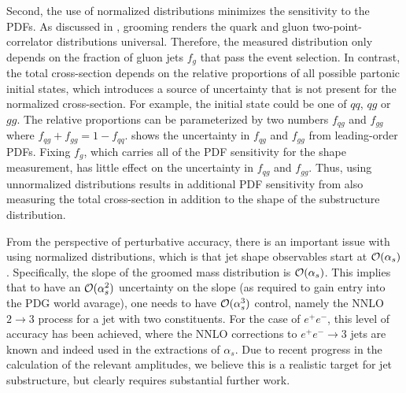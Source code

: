 Second, the use of normalized distributions minimizes the sensitivity to the PDFs.
%
As discussed in , grooming renders the quark and gluon two-point-correlator distributions universal.
%
Therefore, the measured distribution only depends on the fraction of gluon jets $f_g$ that pass the event selection.
%
In contrast, the total cross-section depends on the relative proportions of all possible partonic initial states, which introduces a source of uncertainty that is not present for the normalized cross-section.
%
For example, the initial state could be one of $qq$, $qg$ or $gg$.
%
The relative proportions can be parameterized by two numbers $f_{qg}$ and $f_{gg}$ where $f_{qg}+f_{gg}=1-f_{qq}$.
%
 shows the uncertainty in $f_{qg}$ and $f_{gg}$ from leading-order PDFs.
%
Fixing $f_g$, which carries all of the PDF sensitivity for the shape measurement, has little effect on the uncertainty in $f_{qg}$ and $f_{gg}$.
%
Thus, using unnormalized distributions results in additional PDF sensitivity from also measuring the total cross-section in addition to the shape of the substructure distribution. 


From the perspective of perturbative accuracy, there is an important issue with using normalized distributions, which is that jet shape observables start at ${\mathcal O}(\alpha_s)$.
%
Specifically, the slope of the groomed mass distribution is ${\mathcal O}(\alpha_s)$.
%
This implies that to have an ${\mathcal O}(\alpha_s^2)$ uncertainty on the slope (as required to gain entry into the PDG world avarage), one needs to have ${\mathcal O}(\alpha_s^3)$ control, namely the NNLO $2 \to 3$ process for a jet with two constituents.
%
For the case of $e^+e^-$, this level of accuracy has been achieved, where the NNLO corrections to $e^+e^-\to 3$ jets are known and indeed used in the extractions of $\alpha_s$.
%
Due to recent progress in the calculation of the relevant amplitudes, we believe this is a realistic target for jet substructure, but clearly requires substantial further work.

































